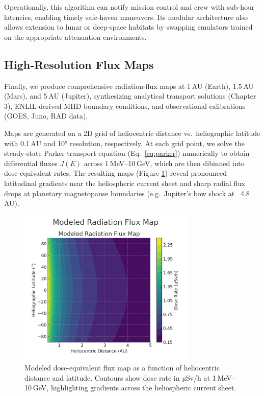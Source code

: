\documentclass[12pt]{report}
\begin{document}
Operationally, this algorithm can notify mission control and crew with sub‐hour latencies, enabling timely safe‐haven maneuvers.  Its modular architecture also allows extension to lunar or deep‐space habitats by swapping emulators trained on the appropriate attenuation environments.

\subsection{High‐Resolution Flux Maps}

Finally, we produce comprehensive radiation‐flux maps at 1 AU (Earth), 1.5 AU (Mars), and 5 AU (Jupiter), synthesizing analytical transport solutions (Chapter 3), ENLIL‐derived MHD boundary conditions, and observational calibrations (GOES, Juno, RAD data).  

Maps are generated on a 2D grid of heliocentric distance vs.\ heliographic latitude with 0.1 AU and 10° resolution, respectively.  At each grid point, we solve the steady‐state Parker transport equation (Eq.~\eqref{eq:parker}) numerically to obtain differential fluxes $J(E)$ across 1 MeV–10 GeV, which are then dibinned into dose‐equivalent rates.  The resulting maps (Figure \ref{fig:flux_map}) reveal pronounced latitudinal gradients near the heliospheric current sheet and sharp radial flux drops at planetary magnetopause boundaries (e.g.\ Jupiter’s bow shock at ~4.8 AU).  

\begin{figure}[ht]
  \centering
  \includegraphics[width=0.75\textwidth]{flux_map.png}
  \caption{Modeled dose‐equivalent flux map as a function of heliocentric distance and latitude.  
           Contours show dose rate in µSv/h at 1 MeV–10 GeV, highlighting gradients across the heliospheric current sheet.}
  \label{fig:flux_map}
\end{figure}
\end{document}
